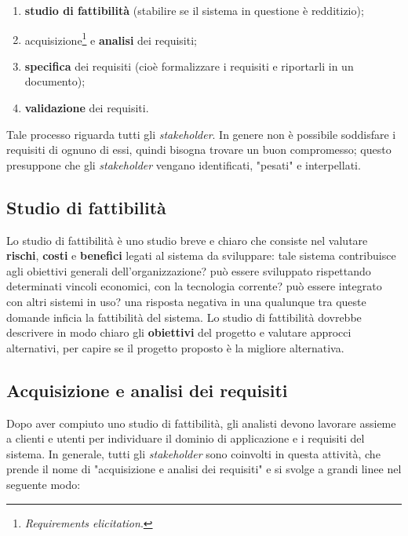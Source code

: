 \documentclass[a4paper]{article}
\begin{document}
	\begin{enumerate}
		
			
	\item \textbf{studio di fattibilità} (stabilire se il sistema in questione è redditizio);
			
	\item acquisizione\footnote{\emph{Requirements elicitation}.} e \textbf{analisi} dei requisiti;
			
	\item \textbf{specifica} dei requisiti (cioè formalizzare i requisiti e riportarli in un documento);
			
	\item \textbf{validazione} dei requisiti.
		
	\end{enumerate}

		
Tale processo riguarda tutti gli \emph{stakeholder}. In genere non è possibile soddisfare i requisiti di ognuno di essi, quindi bisogna trovare un buon compromesso; questo presuppone che gli \emph{stakeholder} vengano identificati, "pesati" e interpellati.

		
	\subsection{Studio di fattibilità}

		
Lo studio di fattibilità è uno studio breve e chiaro che consiste nel valutare \textbf{rischi}, \textbf{costi} e \textbf{benefici} legati al sistema da sviluppare: tale sistema contribuisce agli obiettivi generali dell'organizzazione? può essere sviluppato rispettando determinati vincoli economici, con la tecnologia corrente? può essere integrato con altri sistemi in uso? una risposta negativa in una qualunque tra queste domande inficia la fattibilità del sistema. Lo studio di fattibilità dovrebbe descrivere in modo chiaro gli \textbf{obiettivi} del progetto e valutare approcci alternativi, per capire se il progetto proposto è la migliore alternativa.

		
	\subsection{Acquisizione e analisi dei requisiti}

		
Dopo aver compiuto uno studio di fattibilità, gli analisti devono lavorare assieme a clienti e utenti per individuare il dominio di applicazione e i requisiti del sistema. In generale, tutti gli \emph{stakeholder} sono coinvolti in questa attività, che prende il nome di "acquisizione e analisi dei requisiti" e si svolge a grandi linee nel seguente modo:
		
\end{document}
